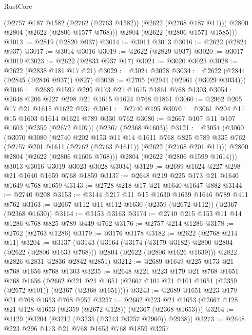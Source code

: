 \begin{lexlean}{RustCore}
\begin{coremodule}
        (@2757 @187 @1582 (@2762 (@2763 @1582)) (@2622 (@2768 @187 @11)))
        @2800
        @2804
        (@2622 (@2806 @1577 @768)))
      @2804
      (@2622 (@2806 @1571 @1585)))
@3013 := @2819 (@2820 @937)
@3014 := @3011 @3013
@3016 := @2622 (@2824 @937)
@3017 := @3014 @3016
@3019 := @2622 (@2829 @937)
@3020 := @3017 @3019
@3023 := @2622 (@2833 @937 @17)
@3024 := @3020 @3023
@3028 := @2622 (@2838 @181 @17 @21)
@3029 := @3024 @3028
@3034 := @2622 (@2844 (@2845 (@2846 @937)) @827)
@3038 := @2705 (@2941 (@2961 (@3029 @3034)))
@3046 := @2689 @1597 @299 @173 @21 @1615 @1861 @768 @1303
@3054 := @2648 @206 @227 @298 @21 @1615 @1624 @768 @1861
@3060 := @2962 @205 @17 @21 @1615 @1622 @937
@3061 := @2740 @195
@3070 := @3061 @204 @11 @15 @1603 @1614 @1621 @789 @330 @762
@3080 := @2667 @107 @11 @107 @1603 (@2359 (@2672 @107)) (@2367 (@2368 @1603))
@3121 := @3054
    (@3060
      (@3070
        @3080
        (@2740
          @202
          @153
          @11
          @14
          @1611
          @768
          @825
          @789
          @335
          @762
          (@2757 @201 @1611 (@2762 (@2763 @1611)) (@2622 (@2768 @201 @11)))
          @2800
          @2804
          (@2622 (@2806 @1606 @768)))
        @2804
        (@2622 (@2806 @1599 @1614)))
      @3013
      @3016
      @3019
      @3023
      @3028
      @3034)
@3129 := @2689 @1624 @227 @298 @21 @1640 @1659 @768 @1859
@3137 := @2648 @219 @225 @173 @21 @1640 @1649 @768 @1659
@3143 := @2728 @218 @17 @21 @1640 @1647 @882
@3144 := @2740 @208
@3153 := @3144 @217 @11 @15 @1630 @1639 @1646 @789 @411 @762
@3163 := @2667 @112 @11 @112 @1630 (@2359 (@2672 @112)) (@2367 (@2368 @1630))
@3164 := @3153 @3163
@3174 := @2740 @215 @153 @11 @14 @1286 @768 @825 @789 @449 @762
@3176 := @2757 @214 @1286
@3178 := @2762 (@2763 @1286)
@3179 := @3176 @3178
@3182 := @2622 (@2768 @214 @11)
@3204 := @3137
    (@3143
      (@3164
        (@3174 (@3179 @3182) @2800 @2804 (@2622 (@2806 @1633 @768)))
        @2804
        (@2622 (@2806 @1626 @1639)))
      @2822
      @2826
      @2831
      @2836
      @2842
      @2851)
@3212 := @2689 @1649 @225 @173 @21 @768 @1656 @768 @1303
@3235 := @2648
    @221
    @223
    @179
    @21
    @768
    @1651
    @768
    @1656
    (@2662 @221 @21 @1651 (@2667 @101 @21 @101 @1651 (@2359 (@2672 @101)) (@2367 (@2368 @1651))))
@3243 := @2689 @1651 @223 @179 @21 @768 @1653 @768 @952
@3257 := @2662 @223 @21 @1653 (@2667 @128 @21 @128 @1653 (@2359 (@2672 @128)) (@2367 (@2368 @1653)))
@3264 := @3129 (@3204 (@3212 (@3235 (@3243 @3257 @2960)) @2938))
@3273 := @2648 @223 @296 @173 @21 @768 @1653 @768 @1859 @3257

\end{coremodule}
\end{lexlean}
